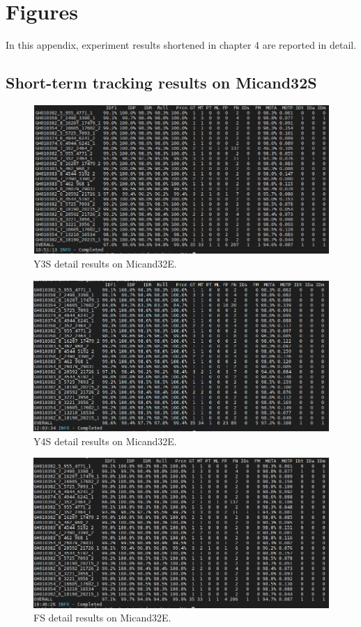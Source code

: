 \chapter{Figures}
In this appendix, experiment results shortened in chapter 4 are reported in detail.
\section{Short-term tracking results on Micand32S}
\begin{figure}
	\centerline{\includegraphics[width=1\linewidth]{Figs/Evaluation/micand26/y3s.png}}
	\caption{Y3S detail results on Micand32E.}
\end{figure}
\begin{figure}
	\centerline{\includegraphics[width=1\linewidth]{Figs/Evaluation/micand26/y4s.png}}
	\caption{Y4S detail results on Micand32E.}
\end{figure}
\begin{figure}
	\centerline{\includegraphics[width=1\linewidth]{Figs/Evaluation/micand26/fs.png}}
	\caption{FS detail results on Micand32E.}
\end{figure}
